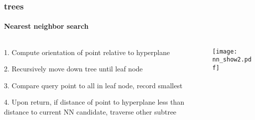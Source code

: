 \begin{frame}[noframenumbering]
  \frametitle{\kd trees}
  \framesubtitle{Nearest neighbor search}
  \begin{columns}[T]
    \begin{column}{.5\textwidth}
      \begin{block}{}%
        {\color{white} 

        {\color{graph-red}
        1.\hspace{1mm} Compute orientation of point relative to hyperplane}
          \\\vspace{0.4cm}
        
        2.\hspace{1mm} Recursively move down tree until leaf node\\\vspace{0.4cm}

        3.\hspace{1mm} Compare query point to all in leaf node, record smallest\\\vspace{0.4cm}
    
        4.\hspace{1mm} Upon return, if distance of point to hyperplane less than distance to current
          NN candidate, traverse other subtree}
      \end{block}
    \end{column}
    \begin{column}{.5\textwidth}
      \begin{block}{}
        \texttt{[image: nn\_show2.pdf]}
      \end{block}
    \end{column}
  \end{columns}
\end{frame}
